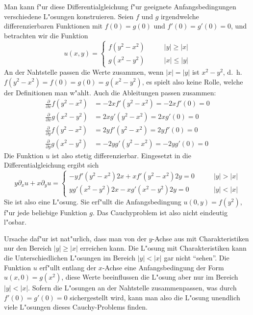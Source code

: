\begin{loesung}
Man kann f"ur diese Differentialgleichung f"ur geeignete Anfangsbedingungen
verschiedene L"osungen konstruieren. Seien $f$ und $g$ irgendwelche
differenzierbaren Funktionen mit $f(0)=g(0)$ und $f'(0)=g'(0)=0$,
und betrachten wir die Funktion
\[
u(x,y)=\begin{cases}
f(y^2-x^2)&\qquad |y|\ge|x|\\
g(x^2-y^2)&\qquad |x|\le|y|
\end{cases}
\]
An der Nahtstelle passen die Werte zusammen, wenn $|x|=|y|$ ist $x^2-y^2$,
d.~h.~$f(y^2-x^2)=f(0)=g(0)=g(x^2-y^2)$, es spielt also keine Rolle, welche
der Definitionen man w"ahlt.
Auch die Ableitungen passen zusammen:
\begin{align*}
\frac{\partial}{\partial x}f(y^2-x^2)&=-2xf'(y^2-x^2)=-2xf'(0)=0
\\
\frac{\partial}{\partial x}g(x^2-y^2)&=2xg'(y^2-x^2)=2xg'(0)=0
\\
\frac{\partial}{\partial y}f(y^2-x^2)&=2yf'(y^2-x^2)=2yf'(0)=0
\\
\frac{\partial}{\partial y}g(x^2-y^2)&=-2yg'(y^2-x^2)=-2yg'(0)=0
\end{align*}
Die Funktion $u$ ist also stetig differenzierbar.
Eingesetzt in die Differentialgleichung ergibt sich
\[
y\partial_xu+x\partial_yu
=
\begin{cases}
-yf'(y^2-x^2)2x+xf'(y^2-x^2)2y=0&\qquad |y|>|x|\\
yg'(x^2-y^2)2x-xg'(x^2-y^2)2y=0&\qquad |y|<|x|
\end{cases}
\]
Sie ist also eine L"osung. Sie erf"ullt die Anfangsbedingung
$u(0,y)=f(y^2)$, f"ur jede beliebige Funktion $g$. Das Cauchyproblem
ist also nicht eindeutig l"osbar.

Ursache daf"ur ist nat"urlich, dass man von der $y$-Achse aus mit
Charakteristiken nur den Bereich $|y|\ge |x|$ erreichen kann.
Die L"osung mit Charakteristiken kann die Unterschiedlichen L"osungen
im Bereich $|y|<|x|$ gar nicht ``sehen''.
Die Funktion $u$ erf"ullt entlang der $x$-Achse eine Anfangsbedingung
der Form $u(x,0)=g(x^2)$, diese Werte beeinflussen die L"osung aber
nur im Bereich $|y|<|x|$. Sofern die L"osungen an der Nahtstelle
zusammenpassen, was durch $f'(0)=g'(0)=0$ sichergestellt wird,
kann man also die L"osung unendlich viele L"osungen dieses Cauchy-Problems
finden.
\end{loesung}

